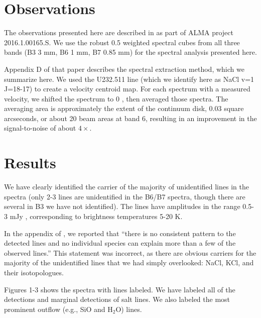 \documentclass[twocolumn]{aastex62}
\begin{document}
\section{Observations}
The observations presented here are described in \citet{Ginsburg2018b} as part
of ALMA project 2016.1.00165.S.  We use the robust 0.5 weighted spectral cubes
from all three bands (B3 3 mm, B6 1 mm, B7 0.85 mm) for the spectral analysis
presented here.

Appendix D of that paper describes the spectral extraction method,
which we summarize here.  We used the U232.511 line (which we identify here as
NaCl v=1 J=18-17) to create a velocity centroid map.  For each spectrum with
a measured velocity, we shifted the spectrum to 0 \kms, then averaged those
spectra.  The averaging area is approximately the extent of the continuum
disk, 0.03 square arcseconds, or about 20 beam areas at band 6, resulting
in an improvement in the signal-to-noise of about $4\times$.


\section{Results}
We have clearly identified the carrier of the majority 
of unidentified lines in the \citet{Ginsburg2018b} spectra (only 2-3 lines are
unidentified in the B6/B7 spectra, though there are several in B3 we have not
identified).
The lines have amplitudes in the range 0.5-3 mJy \perbeam, corresponding
to brightness temperatures 5-20 K.

In the appendix of \citet{Ginsburg2018b}, we reported that ``there is no
consistent pattern to the detected lines and no individual species can explain
more than a few of the observed lines.''  This statement was incorrect, as
there are obvious carriers for the majority of the unidentified lines that we
had simply overlooked: NaCl, KCl, and their isotopologues.

Figures 1-3 shows the spectra with lines labeled.  We have labeled all of the
detections and marginal detections of salt lines.  We also labeled the most
prominent outflow (e.g., SiO and H$_2$O) lines.
\end{document}
